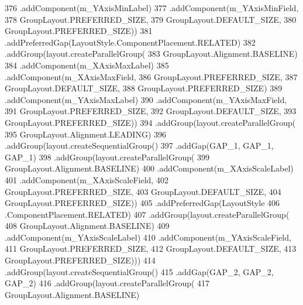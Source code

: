 \begin{DoxyCode}
376                     .addComponent(m\_YAxisMinLabel)
377                     .addComponent(m\_YAxisMinField, 
378                             GroupLayout.PREFERRED\_SIZE, 
379                             GroupLayout.DEFAULT\_SIZE, 
380                             GroupLayout.PREFERRED\_SIZE))
381                 .addPreferredGap(LayoutStyle.ComponentPlacement.RELATED)
382                 .addGroup(layout.createParallelGroup(
383                         GroupLayout.Alignment.BASELINE)
384                     .addComponent(m\_XAxisMaxLabel)
385                     .addComponent(m\_XAxisMaxField, 
386                             GroupLayout.PREFERRED\_SIZE, 
387                             GroupLayout.DEFAULT\_SIZE, 
388                             GroupLayout.PREFERRED\_SIZE)
389                     .addComponent(m\_YAxisMaxLabel)
390                     .addComponent(m\_YAxisMaxField, 
391                             GroupLayout.PREFERRED\_SIZE, 
392                             GroupLayout.DEFAULT\_SIZE,
393                             GroupLayout.PREFERRED\_SIZE))
394                 .addGroup(layout.createParallelGroup(
395                         GroupLayout.Alignment.LEADING)
396                     .addGroup(layout.createSequentialGroup()
397                         .addGap(GAP\_1, GAP\_1, GAP\_1)
398                         .addGroup(layout.createParallelGroup(
399                                 GroupLayout.Alignment.BASELINE)
400                             .addComponent(m\_XAxisScaleLabel)
401                             .addComponent(m\_XAxisScaleField, 
402                                     GroupLayout.PREFERRED\_SIZE, 
403                                     GroupLayout.DEFAULT\_SIZE, 
404                                     GroupLayout.PREFERRED\_SIZE))
405                         .addPreferredGap(LayoutStyle
406                                 .ComponentPlacement.RELATED)
407                         .addGroup(layout.createParallelGroup(
408                                 GroupLayout.Alignment.BASELINE)
409                             .addComponent(m\_YAxisScaleLabel)
410                             .addComponent(m\_YAxisScaleField, 
411                                     GroupLayout.PREFERRED\_SIZE, 
412                                     GroupLayout.DEFAULT\_SIZE, 
413                                     GroupLayout.PREFERRED\_SIZE)))
414                     .addGroup(layout.createSequentialGroup()
415                         .addGap(GAP\_2, GAP\_2, GAP\_2)
416                         .addGroup(layout.createParallelGroup(
417                                 GroupLayout.Alignment.BASELINE)

\end{DoxyCode}
